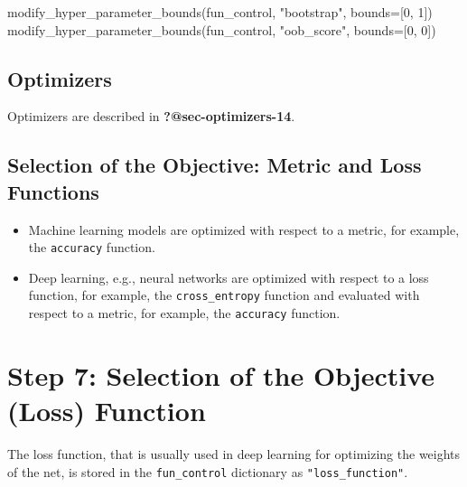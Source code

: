 \documentclass[
  letterpaper,
  DIV=11,
  numbers=noendperiod]{scrreprt}
\newenvironment{Shaded}{\begin{snugshade}}{\end{snugshade}}
\newcommand{\DecValTok}[1]{\textcolor[rgb]{0.68,0.00,0.00}{#1}}
\newcommand{\NormalTok}[1]{\textcolor[rgb]{0.00,0.23,0.31}{#1}}
\newcommand{\OperatorTok}[1]{\textcolor[rgb]{0.37,0.37,0.37}{#1}}
\newcommand{\StringTok}[1]{\textcolor[rgb]{0.13,0.47,0.30}{#1}}
\providecommand{\tightlist}{%
  \setlength{\itemsep}{0pt}\setlength{\parskip}{0pt}}\usepackage{longtable,booktabs,array}
\begin{document}
\begin{Shaded}
\begin{Highlighting}[]
\NormalTok{modify\_hyper\_parameter\_bounds(fun\_control, }\StringTok{"bootstrap"}\NormalTok{, bounds}\OperatorTok{=}\NormalTok{[}\DecValTok{0}\NormalTok{, }\DecValTok{1}\NormalTok{])}
\NormalTok{modify\_hyper\_parameter\_bounds(fun\_control, }\StringTok{"oob\_score"}\NormalTok{, bounds}\OperatorTok{=}\NormalTok{[}\DecValTok{0}\NormalTok{, }\DecValTok{0}\NormalTok{])}
\end{Highlighting}
\end{Shaded}

\hypertarget{sec-optimizers-16}{%
\subsection{Optimizers}\label{sec-optimizers-16}}

Optimizers are described in \textbf{?@sec-optimizers-14}.

\hypertarget{selection-of-the-objective-metric-and-loss-functions}{%
\subsection{Selection of the Objective: Metric and Loss
Functions}\label{selection-of-the-objective-metric-and-loss-functions}}

\begin{itemize}
\tightlist
\item
  Machine learning models are optimized with respect to a metric, for
  example, the \texttt{accuracy} function.
\item
  Deep learning, e.g., neural networks are optimized with respect to a
  loss function, for example, the \texttt{cross\_entropy} function and
  evaluated with respect to a metric, for example, the \texttt{accuracy}
  function.
\end{itemize}

\hypertarget{step-7-selection-of-the-objective-loss-function-1}{%
\section{Step 7: Selection of the Objective (Loss)
Function}\label{step-7-selection-of-the-objective-loss-function-1}}

The loss function, that is usually used in deep learning for optimizing
the weights of the net, is stored in the \texttt{fun\_control}
dictionary as \texttt{"loss\_function"}.
\end{document}
